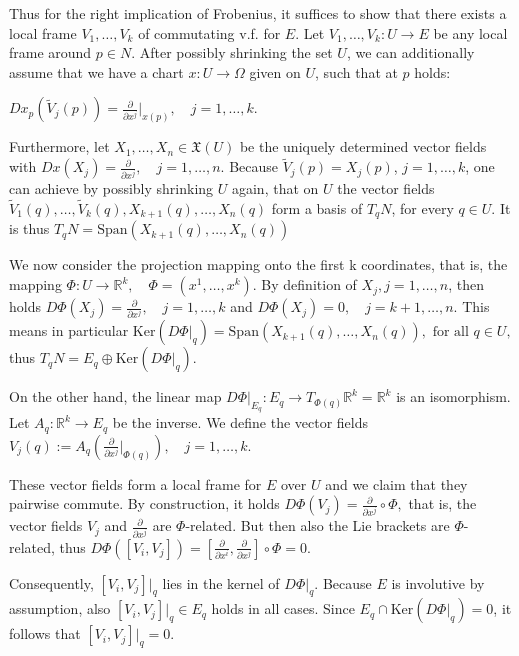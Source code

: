 Thus for the right implication of Frobenius, it suffices to show that there exists a local frame \( V_1, \dots, V_k \) of commutating v.f. for \( E \).
Let \(V_1, \ldots, V_k: U \rightarrow E\) be any local frame around \(p \in N\). 
After possibly shrinking the set \(U\), 
we can additionally assume that we have a chart \(x: U \rightarrow \Omega\) given on \(U\), such that at \(p\) holds:

\(Dx_p(\tilde{V}_j(p)) = \frac{\partial}{\partial x^j} \bigg|_{x(p)}, \quad j = 1, \ldots, k.\)

Furthermore, let \(X_1, \ldots, X_n \in \mathfrak{X}(U)\) be the uniquely determined vector fields with 
\(Dx(X_j) = \frac{\partial}{\partial x^j}, \quad j = 1, \ldots, n.\)
Because \(\tilde{V}_j(p) = X_j(p)\), \(j = 1, \ldots, k\), one can achieve by possibly shrinking \(U\) again, that on \(U\) the vector fields
\(\tilde{V}_1(q), \ldots, \tilde{V}_k(q), X_{k+1}(q), \ldots, X_n(q)\)
form a basis of \(T_q N\), for every \(q \in U\). It is thus
\(T_q N = \text{Span} (X_{k+1}(q), \dots, X_n(q))\)

We now consider the projection mapping onto the first k coordinates, that is, the mapping
\(\Phi: U \to \mathbb{R}^k, \quad \Phi = (x^1, \dots, x^k). \)
By definition of \(X_j, j = 1, \dots, n\), then holds
\(D\Phi(X_j) = \frac{\partial}{\partial x^j}, \quad j = 1, \dots, k\)
and
\(D\Phi(X_j) = 0, \quad j = k+1, \dots, n.\)
This means in particular
\(\text{Ker}(D\Phi|_q) = \text{Span} (X_{k+1}(q), \dots, X_n(q)), \text{ for all } q \in U,\)
thus 
\(T_q N = E_q \oplus \text{Ker}(D\Phi|_q).\)

On the other hand, the linear map
\(D\Phi|_{E_q} : E_q \to T_{\Phi(q)} \mathbb{R}^k = \mathbb{R}^k\)
is an isomorphism. Let \(A_q: \mathbb{R}^k \to E_q\) be the inverse. We define the vector fields
\(V_j(q) := A_q \left( \frac{\partial}{\partial x^j} \bigg|_{\Phi(q)} \right), \quad j = 1, \dots, k.\)

These vector fields form a local frame for \(E\) over \(U\) and we claim that they pairwise commute. By construction, it holds
\(D\Phi(V_j) = \frac{\partial}{\partial x^j} \circ \Phi,\)
that is, the vector fields \(V_j\) and \(\frac{\partial}{\partial x^j}\) are \(\Phi\)-related. But then also the Lie brackets are \(\Phi\)-related, thus
\(D\Phi([V_i, V_j]) = \left[ \frac{\partial}{\partial x^i}, \frac{\partial}{\partial x^j} \right] \circ \Phi = 0.\)

Consequently, \([V_i, V_j]|_q\) lies in the kernel of \(D\Phi|_q\). 
Because \(E\) is involutive by assumption, also \([V_i, V_j]|_q \in E_q\) holds in all cases. 
Since \(E_q \cap \text{Ker}(D\Phi|_q) = 0\), it follows that \([V_i, V_j]|_q = 0\).
